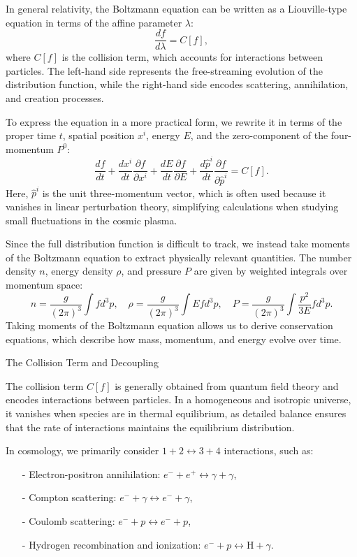 \documentclass{aa}
\begin{document}
In general relativity, the Boltzmann equation can be written as a Liouville-type equation in terms of the affine parameter $\lambda$:
\begin{equation}
\frac{df}{d\lambda} = C[f],
\end{equation}
where $C[f]$ is the collision term, which accounts for interactions between particles. The left-hand side represents the free-streaming evolution of the distribution function, while the right-hand side encodes scattering, annihilation, and creation processes.

To express the equation in a more practical form, we rewrite it in terms of the proper time $t$, spatial position $x^i$, energy $E$, and the zero-component of the four-momentum $P^0$:
\begin{equation}
\frac{df}{dt} + \frac{dx^i}{dt} \frac{\partial f}{\partial x^i} + \frac{dE}{dt} \frac{\partial f}{\partial E} + \frac{d\hat{p}^i}{dt} \frac{\partial f}{\partial \hat{p}^i} = C[f].
\end{equation}
Here, $\hat{p}^i$ is the unit three-momentum vector, which is often used because it vanishes in linear perturbation theory, simplifying calculations when studying small fluctuations in the cosmic plasma.

Since the full distribution function is difficult to track, we instead take moments of the Boltzmann equation to extract physically relevant quantities. The number density $n$, energy density $\rho$, and pressure $P$ are given by weighted integrals over momentum space:
\begin{equation}
n = \frac{g}{(2\pi)^3} \int f d^3p, \quad
\rho = \frac{g}{(2\pi)^3} \int E f d^3p, \quad
P = \frac{g}{(2\pi)^3} \int \frac{p^2}{3E} f d^3p.
\end{equation}
Taking moments of the Boltzmann equation allows us to derive conservation equations, which describe how mass, momentum, and energy evolve over time.

 The Collision Term and Decoupling

The collision term $C[f]$ is generally obtained from quantum field theory and encodes interactions between particles. In a homogeneous and isotropic universe, it vanishes when species are in thermal equilibrium, as detailed balance ensures that the rate of interactions maintains the equilibrium distribution.

In cosmology, we primarily consider $1+2 \leftrightarrow 3+4$ interactions, such as:
\begin{enumerate}
  \item [-] Electron-positron annihilation: $e^- + e^+ \leftrightarrow \gamma + \gamma$,
  \item [-] Compton scattering: $e^- + \gamma \leftrightarrow e^- + \gamma$,
  \item [-] Coulomb scattering: $e^- + p \leftrightarrow e^- + p$,
  \item [-] Hydrogen recombination and ionization: $e^- + p \leftrightarrow \text{H} + \gamma$.
\end{enumerate}
\end{document}
